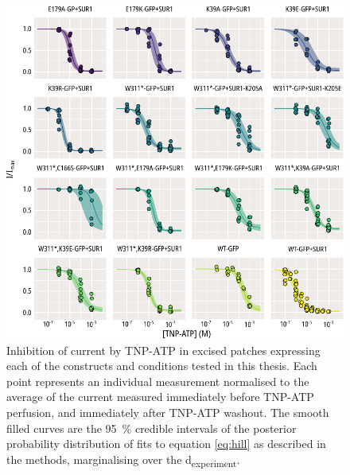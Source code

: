 \begin{figure}[h]
	\centering
	\includegraphics[width=\textwidth]{all_tnpatp_fits.pdf}
	\caption[TNP-ATP inhibition population hill fits]{
	{\bf{}}
	Inhibition of current by TNP-ATP in excised patches expressing each of the constructs and conditions tested in this thesis.
	Each point represents an individual measurement normalised to the average of the current measured immediately before TNP-ATP perfusion, and immediately after TNP-ATP washout.
	The smooth filled curves are the \SI{95}{\percent} credible intervals of the posterior probability distribution of fits to equation \ref{eq:hill} as described in the methods, marginalising over the \textgreek{d}\textsubscript{experiment}.
	}
	\label{apxfig:tnpatp_inhib_1}
\end{figure}

